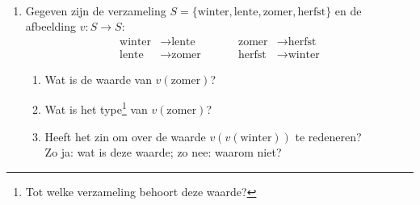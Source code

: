 \begin{answer}\mbox{}\\
  \begin{enumerate}[label=\textbf{\alph*.}]
    \item Gegeven zijn de verzameling $S = \{ \text{winter}, \text{lente}, \text{zomer}, \text{herfst} \}$ en de afbeelding $v : S \to S$:
  \begin{equation*}
  \begin{aligned}
    \text{winter} &\longrightarrow \text{lente}\quad\quad\quad &
    \text{zomer} &\longrightarrow \text{herfst}\\
    \text{lente} &\longrightarrow \text{zomer}&
    \text{herfst} &\longrightarrow \text{winter}
  \end{aligned}
  \end{equation*}
  \begin{enumerate}[label=\textbf{\alph*.}]
      \item Wat is de waarde van $v(\text{zomer})$?
      \item Wat is het type\footnote{Tot welke verzameling behoort deze waarde?} van $v(\text{zomer})$?
      \item Heeft het zin om over de waarde $v(v(\text{winter}))$ te redeneren?\\ Zo ja: wat is deze waarde; zo nee: waarom niet?\\
  \end{enumerate}


\end{enumerate}
\end{answer}
